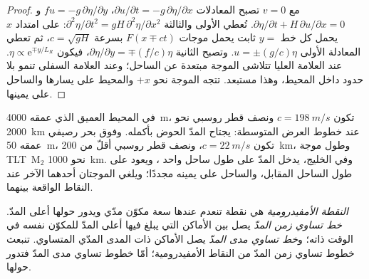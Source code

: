 \begin{proof}
مع $v = 0$ تصبح المعادلات $\partial u/\partial t = -g\,\partial\eta/
\partial x$، $fu = -g\,\partial\eta/\partial y$ و$\partial\eta/\partial t
+ H\,\partial u/\partial x = 0$. تُعطي الأولى والثالثة $\partial^2
\eta/\partial t^2 = gH\,\partial^2\eta/\partial x^2$: على امتداد $x$ يحمل كل خط
$y = $ ثابت يحمل موجات $F(x \mp ct)$ بسرعة $c = \sqrt{gH}$، ثم
تعطي المعادلة الأولى $u = \pm(g/c)\eta$. وتصبح الثانية $\partial\eta/
\partial y = \mp(f/c)\eta$، فيكون $\eta \propto \mathrm e^{\mp y/L_R}$. عند
العلامة العليا تتلاشى الموجة مبتعدة عن الساحل؛ وعند العلامة السفلى
تنمو بلا حدود داخل المحيط، وهذا مستبعد. تتجه الموجة
نحو $+x$ والمحيط على يسارها والساحل على يمينها.
\end{proof}

في المحيط العميق الذي عمقه \qty{4000}{m}، تكون $c = \qty{198}{m/s}$
ونصف قطر روسبي نحو \qty{2000}{km} عند خطوط العرض المتوسطة: يجتاح المدّ
الحوض بأكمله. وفوق بحر رصيفي عمقه \qty{50}{m}، تكون $c =
\qty{22}{m/s}$، ونصف قطر روسبي أقلّ من \qty{200}{km}، وطول موجة \mbox{\textdir TLT M$_2$}
نحو \qty{1000}{km}. وفي الخليج، يدخل المدّ على طول ساحل واحد
، ويعود على طول الساحل المقابل، والساحل على يمينه مجددًا؛
ويلغي الموجتان أحدهما الآخر عند النقاط الواقعة بينهما.

\begin{definition}\label{def:b3:ocean-dynamics:amphidrome}
\emph{النقطة الأمفيدرومية} هي نقطة تنعدم عندها سعة مكوّن مدّي
ويدور حولها أعلى المدّ. \emph{خط تساوي زمن المدّ} يصل بين
الأماكن التي يبلغ فيها أعلى المدّ للمكوّن نفسه في الوقت ذاته؛ و\emph{خط تساوي مدى
المدّ} يصل الأماكن ذات المدى المدّي المتساوي.
تنبعث خطوط تساوي زمن المدّ من النقاط الأمفيدرومية؛
أمّا خطوط تساوي مدى المدّ فتدور حولها.
\end{definition}

